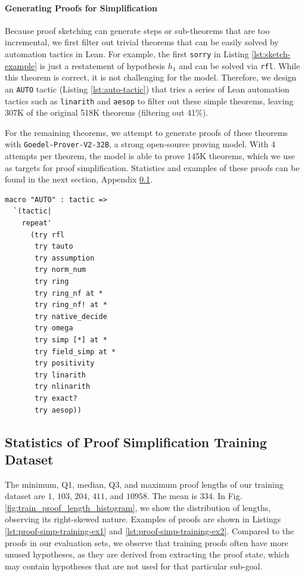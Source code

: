 \paragraph{Generating Proofs for Simplification} Because proof sketching can generate steps or sub-theorems that are too incremental, we first filter out trivial theorems that can be easily solved by automation tactics in Lean. For example, the first \texttt{sorry} in Listing \ref{lst:sketch-example} is just a restatement of hypothesis $h_1$ and can be solved via \texttt{rfl}. While this theorem is correct, it is not challenging for the model. Therefore, we design an \texttt{AUTO} tactic (Listing \ref{lst:auto-tactic}) that tries a series of Lean automation tactics such as \texttt{linarith} and \texttt{aesop} to filter out these simple theorems, leaving 307K of the original 518K theorems (filtering out 41\%).

For the remaining theorems, we attempt to generate proofs of these theorems with \texttt{Goedel-Prover-V2-32B}, a strong open-source proving model. With 4 attempts per theorem, the model is able to prove 145K theorems, which we use as targets for proof simplification. Statistics and examples of these proofs can be found in the next section, Appendix \ref{sec:proof-simp-training-stats}.

\begin{tcolorbox}[colback=lightblue, boxrule=0pt, arc=5pt, outer arc=5pt, after skip=10pt plus 2pt]
\begin{lstlisting}[caption={AUTO tactic for filtering trivial theorems},label={lst:auto-tactic}, captionpos=t, language=lean, breaklines=true, style=mystyle]
macro "AUTO" : tactic =>
  `(tactic|
    repeat'
      (try rfl
       try tauto
       try assumption
       try norm_num
       try ring
       try ring_nf at *
       try ring_nf! at *
       try native_decide
       try omega
       try simp [*] at *
       try field_simp at *
       try positivity
       try linarith
       try nlinarith
       try exact?
       try aesop))
\end{lstlisting}
\end{tcolorbox}


\subsection{Statistics of Proof Simplification Training Dataset} \label{sec:proof-simp-training-stats}

The minimum, Q1, median, Q3, and maximum proof lengths of our training dataset are $1$, $103$, $204$, $411$, and $10958$. The mean is $334$. In Fig. \ref{fig:train_proof_length_histogram}, we show the distribution of lengths, observing its right-skewed nature. Examples of proofs are shown in Listings \ref{lst:proof-simp-training-ex1} and \ref{lst:proof-simp-training-ex2}. Compared to the proofs in our evaluation sets, we observe that training proofs often have more unused hypotheses, as they are derived from extracting the proof state, which may contain hypotheses that are not used for that particular sub-goal. 

